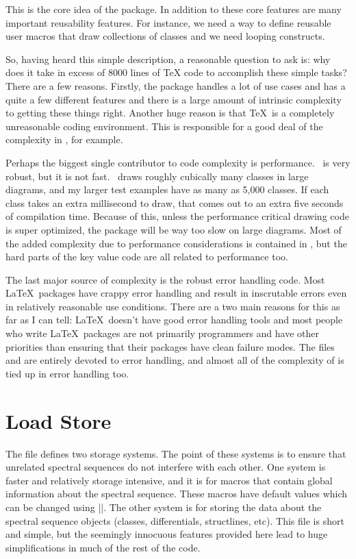 This is the core idea of the package. In addition to these core features are many important reusability features. For instance, we need a way to define reusable user macros that draw collections of classes and we need looping constructs.

So, having heard this simple description, a reasonable question to ask is: why does it take in excess of 8000 lines of TeX code to accomplish these simple tasks? There are a few reasons. Firstly, the package handles a lot of use cases and has a quite a few different features and there is a large amount of intrinsic complexity to getting these things right. Another huge reason is that \TeX\ is a completely unreasonable coding environment. This is responsible for a good deal of the complexity in , for example.

Perhaps the biggest single contributor to code complexity is performance. \tikzname\ is very robust, but it is not fast. \spectralsequences\ draws roughly cubically many classes in large diagrams, and my larger test examples have as many as 5,000 classes. If each class takes an extra millisecond to draw, that comes out to an extra five seconds of compilation time. Because of this, unless the performance critical drawing code is super optimized, the package will be way too slow on large diagrams. Most of the added complexity due to performance considerations is contained in , but the hard parts of the key value code are all related to performance too.

The last major source of complexity is the robust error handling code. Most \LaTeX\ packages have crappy error handling and result in inscrutable errors even in relatively reasonable use conditions. There are a two main reasons for this as far as I can tell: \LaTeX\ doesn't have good error handling tools and most people who write \LaTeX\ packages are not primarily programmers and have other priorities than ensuring that their packages have clean failure modes. The files  and  are entirely devoted to error handling, and almost all of the complexity of  is tied up in error handling too.



\section{Load Store}
The file  defines two storage systems. The point of these systems is to ensure that unrelated spectral sequences do not interfere with each other. One system is faster and relatively storage intensive, and it is for macros that contain global information about the spectral sequence. These macros have default values which can be changed using |\sseqset|. The other system is for storing the data about the spectral sequence objects (classes, differentials, structlines, etc). This file is short and simple, but the seemingly innocuous features provided here lead to huge simplifications in much of the rest of the code.


